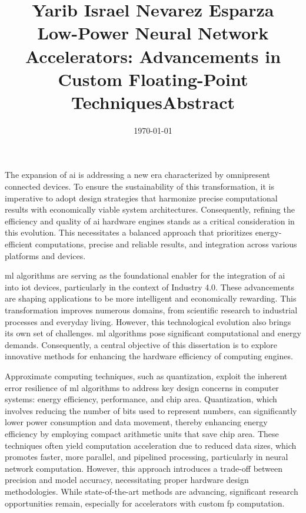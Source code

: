\documentclass{article}
\title{Yarib Israel Nevarez Esparza \\ Low-Power Neural Network Accelerators:
	Advancements in Custom Floating-Point Techniques}
\author{}
\date{\today}
\begin{document}
\maketitle

\title{\textbf{Abstract}}
\thispagestyle{empty}

The expansion of \gls{ai} is addressing a new era characterized by omnipresent connected devices. To ensure the sustainability of this transformation, it is imperative to adopt design strategies that harmonize precise computational results with economically viable system architectures. Consequently, refining the efficiency and quality of \gls{ai} hardware engines stands as a critical consideration in this evolution. This necessitates a balanced approach that prioritizes energy-efficient computations, precise and reliable results, and integration across various platforms and devices.

\gls{ml} algorithms are serving as the foundational enabler for the integration of \gls{ai} into \gls{iot} devices, particularly in the context of Industry 4.0. These advancements are shaping applications to be more intelligent and economically rewarding. This transformation improves numerous domains, from scientific research to industrial processes and everyday living. However, this technological evolution also brings its own set of challenges. \gls{ml} algorithms pose significant computational and energy demands. Consequently, a central objective of this dissertation is to explore innovative methods for enhancing the hardware efficiency of computing engines.

Approximate computing techniques, such as quantization, exploit the inherent error resilience of \gls{ml} algorithms to address key design concerns in computer systems: energy efficiency, performance, and chip area. Quantization, which involves reducing the number of bits used to represent numbers, can significantly lower power consumption and data movement, thereby enhancing energy efficiency by employing compact arithmetic units that save chip area. These techniques often yield computation acceleration due to reduced data sizes, which promotes faster, more parallel, and pipelined processing, particularly in neural network computation. However, this approach introduces a trade-off between precision and model accuracy, necessitating proper hardware design methodologies. While state-of-the-art methods are advancing, significant research opportunities remain, especially for accelerators with custom \gls{fp} computation.
\end{document}
